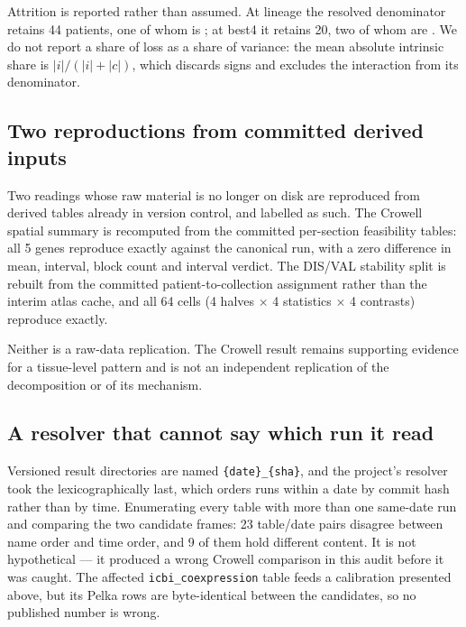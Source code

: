 Attrition is reported rather than assumed. At lineage the resolved denominator
retains 44 patients, one of whom is \notest{}; at best4 it retains 20, two of
whom are \notest{}. We do not report a share of loss as a share of variance: the
mean absolute intrinsic share is $|i|/(|i|+|c|)$, which discards signs and
excludes the interaction from its denominator.

\subsection{Two reproductions from committed derived inputs}
\label{sec:reproductions}

Two readings whose raw material is no longer on disk are reproduced from derived
tables already in version control, and labelled as such. The Crowell spatial
summary is recomputed from the committed per-section feasibility tables: all 5
genes reproduce exactly against the canonical run, with a zero difference in mean,
interval, block count and interval verdict. The DIS/VAL stability split is
rebuilt from the committed patient-to-collection assignment rather than the
interim atlas cache, and all 64 cells (4 halves $\times$ 4 statistics $\times$ 4
contrasts) reproduce exactly.

Neither is a raw-data replication. The Crowell result remains supporting
evidence for a tissue-level pattern and is not an independent replication of the
decomposition or of its mechanism.

\subsection{A resolver that cannot say which run it read}
\label{sec:resolver}

Versioned result directories are named \texttt{\{date\}\_\{sha\}}, and the
project's resolver took the lexicographically last, which orders runs within a
date by commit hash rather than by time. Enumerating every table with more than
one same-date run and comparing the two candidate frames: 23 table/date pairs
disagree between name order and time order, and 9 of them hold different content.
It is not hypothetical --- it produced a wrong Crowell comparison in this audit
before it was caught. The affected \texttt{icbi\_coexpression} table feeds a
calibration presented above, but its Pelka rows are byte-identical between the
candidates, so no published number is wrong.


